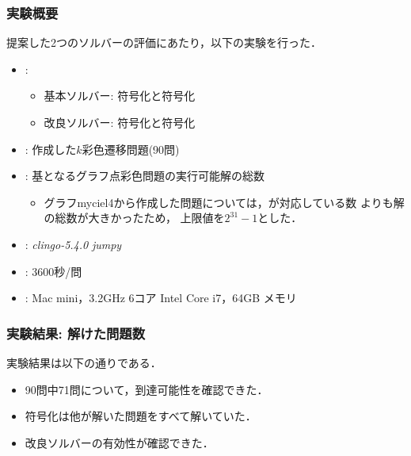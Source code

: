 \documentclass[dvipdfmx,11pt]{beamer}
\begin{document}
\begin{frame}\frametitle{実験概要}
  提案した2つのソルバーの評価にあたり，以下の実験を行った．
  \bigskip
  \begin{itemize}
    \item {}: 
          \begin{itemize}
            \item 基本ソルバー: 符号化と符号化
            \item 改良ソルバー: 符号化と符号化
          \end{itemize}
    \item {}: 作成した$k$彩色遷移問題(90問)
    \item {}: 基となるグラフ点彩色問題の実行可能解の総数
          \begin{itemize}
            \item グラフmyciel4から作成した問題については，{\clingo}が対応している数
                  よりも解の総数が大きかったため，
                  上限値を$2^{31}-1$とした．
          \end{itemize}
    \item {}: \textit{clingo-5.4.0} \textit{jumpy}
    \item {}: 3600秒/問
    \item {}: Mac mini，3.2GHz 6コア Intel Core i7，64GB メモリ
  \end{itemize}
  
\end{frame}
\begin{frame}\frametitle{実験結果: 解けた問題数}

実験結果は以下の通りである．
\bigskip

\begin{exampleblock}{}
  \centering
  \scalebox{0.8}{}
\end{exampleblock}
  
  \begin{itemize}
    \item 90問中71問について，到達可能性を確認できた．
    \item {}符号化は他が解いた問題をすべて解いていた．
    \item 改良ソルバーの有効性が確認できた．
  \end{itemize}

\end{frame}
\end{document}
